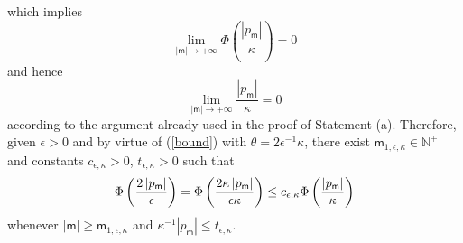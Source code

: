 \documentclass{article}
\begin{document}
which implies%
\begin{equation*}
\lim_{\left\vert \mathsf{m}\right\vert \rightarrow +\infty }\Phi \left( 
\frac{\left\vert p_{\mathsf{m}}\right\vert }{\kappa }\right) =0
\end{equation*}%
and hence 
\begin{equation*}
\lim_{\left\vert \mathsf{m}\right\vert \rightarrow +\infty }\frac{\left\vert
p_{\mathsf{m}}\right\vert }{\kappa }=0
\end{equation*}%
according to the argument already used in the proof of Statement (a).
Therefore, given $\epsilon >0$ and by virtue of (\ref{bound}) with $\theta
=2\epsilon ^{-1}\kappa $, there exist $\mathsf{m}_{1,\epsilon ,\kappa }\in 
\mathbb{N}^{+}$ and constants $c_{\epsilon ,\kappa }>0$, $t_{\epsilon
,\kappa }>0$ such that 
\begin{equation}
\Phi \left( \frac{2\left\vert p_{\mathsf{m}}\right\vert }{\epsilon }\right)
=\Phi \left( \frac{2\kappa \left\vert p_{\mathsf{m}}\right\vert }{\epsilon
\kappa }\right) \leq c_{\epsilon ,\kappa }\Phi \left( \frac{\left\vert p_{%
\mathsf{m}}\right\vert }{\kappa }\right)  \label{inequality12}
\end{equation}%
whenever $\left\vert \mathsf{m}\right\vert \geq \mathsf{m}_{1,\epsilon
,\kappa }$ and $\kappa ^{-1}\left\vert p_{\mathsf{m}}\right\vert \leq
t_{\epsilon ,\kappa }$.
\end{document}
